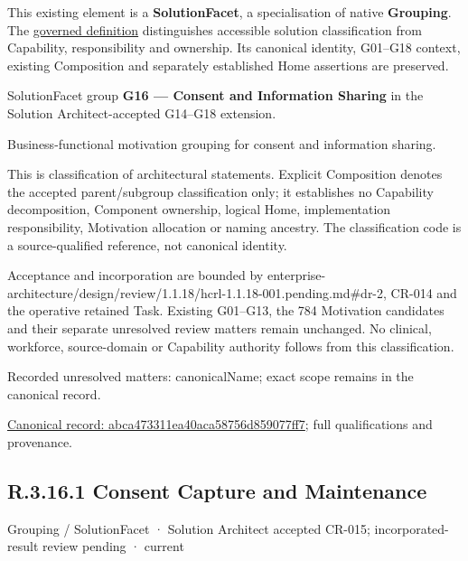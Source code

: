 This existing element is a \textbf{SolutionFacet}, a specialisation of native
\textbf{Grouping}. The \href{\detokenize{../../../../../../../governance/continuum-representation.md#solutionfacet-classification--1119-candidate}}{governed definition}
distinguishes accessible solution classification from Capability, responsibility
and ownership. Its canonical identity, G01–G18 context, existing Composition
and separately established Home assertions are preserved.



SolutionFacet group \textbf{G16 — Consent and Information Sharing} in the Solution Architect-accepted G14–G18 extension.



Business-functional motivation grouping for consent and information sharing.



This is classification of architectural statements. Explicit Composition denotes the accepted parent/subgroup classification only; it establishes no Capability decomposition, Component ownership, logical Home, implementation responsibility, Motivation allocation or naming ancestry. The classification code is a source-qualified reference, not canonical identity.



Acceptance and incorporation are bounded by enterprise-architecture/design/review/1.1.18/hcrl-1.1.18-001.pending.md\#dr-2, CR-014 and the operative retained Task. Existing G01–G13, the 784 Motivation candidates and their separate unresolved review matters remain unchanged. No clinical, workforce, source-domain or Capability authority follows from this classification.


{\small Recorded unresolved matters: canonicalName; exact scope remains in the canonical record.}\par
{\footnotesize \href{../../../../../../../continuum/grouping/abca473311ea40aca58756d859077ff7.md}{Canonical record: abca473311ea40aca58756d859077ff7}; full qualifications and provenance.}\par
\subsection*{R.3.16.1 Consent Capture and Maintenance}
\label{navigation:R.3.16.1}

\label{element:884f06591f6c4dcf8e7f94e4b31269c1}
{\small Grouping / SolutionFacet · Solution Architect accepted CR-015; incorporated-result review pending · current}\par

